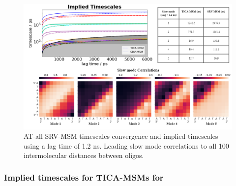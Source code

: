 \documentclass[journal=jpcbfk,manuscript=article]{achemso}
\begin{document}
\begin{figure}[ht!]
	\begin{center}
        \includegraphics[width=\textwidth]{Figs/figs_0804/AT-all_dynamic.png}
        \caption{AT-all SRV-MSM timescales convergence and implied timescales using a lag time of 1.2 ns. Leading slow mode correlations to all 100 intermolecular distances between oligos.}
        \label{fig:AT-all_dynamic}
	\end{center}
\end{figure}

\subsubsection{\label{sec:Results}Implied timescales for TICA-MSMs for }
\end{document}

